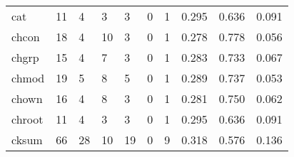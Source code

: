 \begin{longtable}{lp{1.3cm}p{1.3cm}p{1.3cm}p{1.3cm}p{1.3cm}p{1.3cm}p{1.3cm}p{1.3cm}p{1.3cm}}
cat       &                     11 &                                             4 &                                            3 &                                           3 &                                            0 &                                          1 &                                0.295 &                                  0.636 &                                0.091 \\
chcon     &                     18 &                                             4 &                                           10 &                                           3 &                                            0 &                                          1 &                                0.278 &                                  0.778 &                                0.056 \\
chgrp     &                     15 &                                             4 &                                            7 &                                           3 &                                            0 &                                          1 &                                0.283 &                                  0.733 &                                0.067 \\
chmod     &                     19 &                                             5 &                                            8 &                                           5 &                                            0 &                                          1 &                                0.289 &                                  0.737 &                                0.053 \\
chown     &                     16 &                                             4 &                                            8 &                                           3 &                                            0 &                                          1 &                                0.281 &                                  0.750 &                                0.062 \\
chroot    &                     11 &                                             4 &                                            3 &                                           3 &                                            0 &                                          1 &                                0.295 &                                  0.636 &                                0.091 \\
cksum     &                     66 &                                            28 &                                           10 &                                          19 &                                            0 &                                          9 &                                0.318 &                                  0.576 &                                0.136 \\

\end{longtable}
